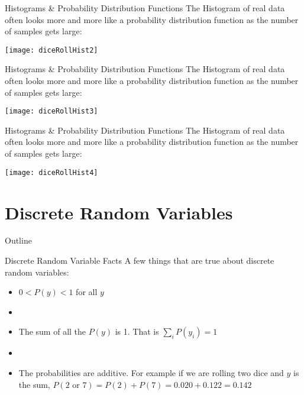 \documentclass[xcolor=dvipsnames]{beamer}
\begin{document}
\begin{frame}{Histograms \& Probability Distribution Functions}
	The Histogram of real data often looks more and more like a probability distribution function as the number of samples gets large:
	\begin{center}
		\texttt{[image: diceRollHist2]}
	\end{center}
\end{frame}

\begin{frame}{Histograms \& Probability Distribution Functions}
	The Histogram of real data often looks more and more like a probability distribution function as the number of samples gets large:
	\begin{center}
		\texttt{[image: diceRollHist3]}
	\end{center}
\end{frame}

\begin{frame}{Histograms \& Probability Distribution Functions}
	The Histogram of real data often looks more and more like a probability distribution function as the number of samples gets large:
	\begin{center}
		\texttt{[image: diceRollHist4]}
	\end{center}
\end{frame}

\section{Discrete Random Variables}
\begin{frame}{Outline}
	\tableofcontents[currentsection,subsectionstyle=show/shaded/hide]
\end{frame}

\begin{frame}{Discrete Random Variable Facts}
	A few things that are true about discrete random variables:
	\begin{itemize}
		\item $0 < P(y) < 1$ for all $y$ \pause
		\item[]
		\item The sum of all the $P(y)$ is 1. That is $\sum_{i} P(y_i) = 1$ \pause
		\item[]
		\item The probabilities are additive. For example if we are rolling two dice and $y$ is the sum, $P(2 \text{ or } 7) = P(2) + P(7) = 0.020 + 0.122 = 0.142$
	\end{itemize}
\end{frame}
\end{document}
